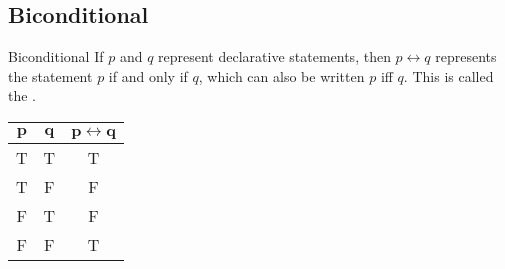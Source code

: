 \documentclass[\main/notes.tex]{subfiles}
\begin{document}
			\subsection{Biconditional}
				\begin{definition}{Biconditional}
					If $p$ and $q$ represent declarative statements, then $p \leftrightarrow q$ represents the statement $p$ if and only if $q$, which can also be written $p$ iff $q$. This is called the .
				\end{definition}
				\nopagebreak
				\begin{center}
					\begin{tabular}{|c c | c|}
						\hline
						$\mathbf{p}$ & $\mathbf{q}$ & $\mathbf{p \leftrightarrow q}$\\
						\hline
						T & T & T\\
						T & F & F\\
						F & T & F\\
						F & F & T\\
						\hline
					\end{tabular}	
				\end{center}
\end{document}
